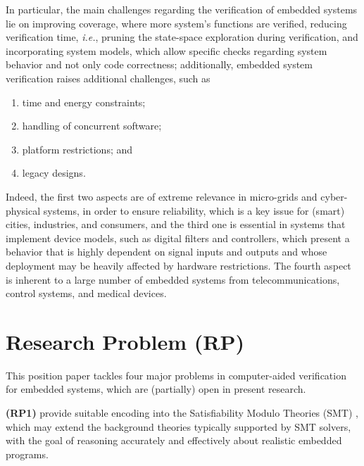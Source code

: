 \documentclass{acm_sen_article}
\begin{document}
In particular, the main challenges regarding the verification of embedded systems lie on improving coverage, where more system's functions are verified, reducing verification time, {\it i.e.}, pruning the state-space exploration during verification, and incorporating system models, which allow specific checks regarding system behavior and not only code correctness; additionally, embedded system verification raises additional challenges, such as 
%
\begin{enumerate}
	\item time and energy constraints;
	\item handling of concurrent software;
	\item platform restrictions; and
	\item legacy designs.%
\end{enumerate}

Indeed, the first two aspects are of extreme relevance in micro-grids and cyber-physical systems, in order to ensure reliability, which is a key issue for (smart) cities, industries, and consumers, and the third one is essential in systems that implement device models, such as digital filters and controllers, which present a behavior that is highly dependent on signal inputs and outputs and whose deployment may be heavily affected by hardware restrictions. The fourth aspect is inherent to a large number of embedded systems from  telecommunications, control systems, and medical devices.


\section{Research Problem (RP)}

This position paper tackles four major problems in computer-aided verification for embedded systems, which are (partially) open in present research.

\textbf{(RP1)} provide suitable encoding into the Satisfiability Modulo Theories (SMT) \cite{BarrettSST09}, which may extend the background theories typically supported by SMT solvers, with the goal of reasoning accurately and effectively about realistic embedded programs.
\end{document}
